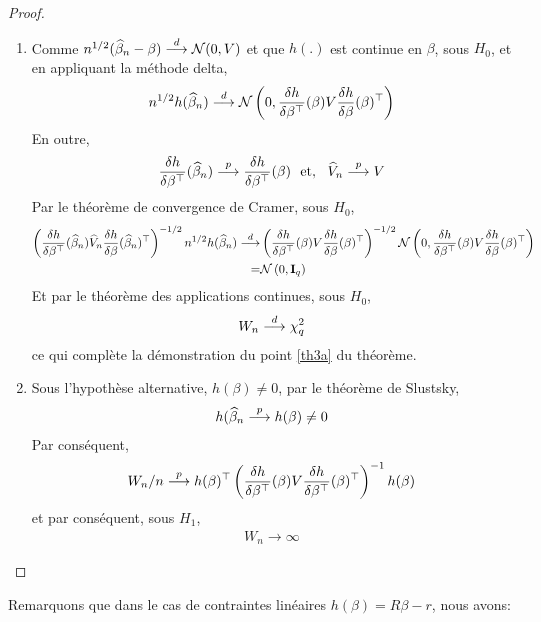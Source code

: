 \documentclass[12pt, reqno]{amsart}
\begin{document}
\begin{proof} 
\begin{enumerate}
\item Comme $n^{1/2}(\widehat{\beta}_n - \beta) \overset{d}{\longrightarrow} \mathcal{N}(0, V)$ et que $h(.)$ est continue en $\beta$, sous $H_0$, et en appliquant la méthode delta,
\begin{align*}
n^{1/2}h(\widehat{\beta}_n) \overset{d}{\longrightarrow} \mathcal{N}\left(0, \frac{\delta h}{\delta \beta^\top}(\beta) V \frac{\delta h}{\delta \beta}(\beta)^\top \right)
\end{align*}
En outre,
\begin{align*}
\frac{\delta h}{\delta \beta^\top}(\widehat{\beta}_n) \overset{p}{\longrightarrow} \frac{\delta h}{\delta \beta^\top}(\beta) \ \ \textrm{et}, \ \ \widehat{V}_n \overset{p}{\longrightarrow} V
\end{align*}
Par le théorème de convergence de Cramer, sous $H_0$,
\begin{align*}
\left(\frac{\delta h}{\delta \beta ^ \top}(\widehat{\beta}_n)\widehat{V}_n \frac{\delta h}{\delta \beta}(\widehat{\beta}_n)^\top \right)^{-1/2}n^{1/2} h(\widehat{\beta}_n) 
\overset{d}{\longrightarrow} & \left(\frac{\delta h}{\delta \beta^\top}(\beta) V \frac{\delta h}{\delta \beta}(\beta)^\top\right)^{-1/2} \mathcal{N}\left(0, \frac{\delta h}{\delta \beta^\top}(\beta) V \frac{\delta h}{\delta \beta}(\beta)^\top\right)\\
= & \mathcal{N}\left(0, \mathbf{I}_q \right)
\end{align*}
Et par le théorème des applications continues, sous $H_0$,
\begin{align*}
W_n \overset{d}{\longrightarrow} \chi^2_q
\end{align*}
ce qui complète la démonstration du point \ref{th3a} du théorème.
\item Sous l'hypothèse alternative, $h(\beta)\neq 0$, par le théorème de Slustsky,
\begin{align*}
h(\widehat{\beta}_n \overset{p}{\longrightarrow} h(\beta) \neq 0
\end{align*}
Par conséquent, 
\begin{align*}
W_n /n \overset{p}{\longrightarrow} h(\beta)^\top\left(\frac{\delta h}{\delta \beta^\top}(\beta) V \frac{\delta h}{\delta \beta^\top}(\beta)^\top \right)^{-1} h(\beta)
\end{align*}
et par conséquent, sous $H_1$, 
\begin{align*}
W_n \rightarrow \infty
\end{align*}
\end{enumerate}
\end{proof}
Remarquons que dans le cas de contraintes linéaires $h(\beta) = R\beta - r$, nous avons:
\end{document}
